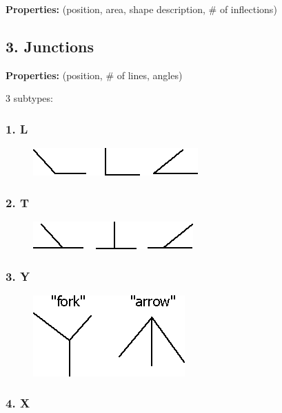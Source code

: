 \textbf{Properties:} (position, area, shape description, \# of inflections)

\subsection{3. Junctions}

\textbf{Properties:} (position, \# of lines, angles) 

3 subtypes:

\subsubsection{1. L}

\begin{figure}[H]
\centering
\includegraphics[scale=0.7]{Junctions-L.PNG}
\end{figure}

\subsubsection{2. T}

\begin{figure}[H]
\centering
\includegraphics[scale=0.7]{Junctions-T.PNG}
\end{figure}

\subsubsection{3. Y }

\begin{figure}[H]
\centering
\includegraphics[scale=0.7]{Junctions-Y.PNG}
\end{figure}

\subsubsection{4. X}

